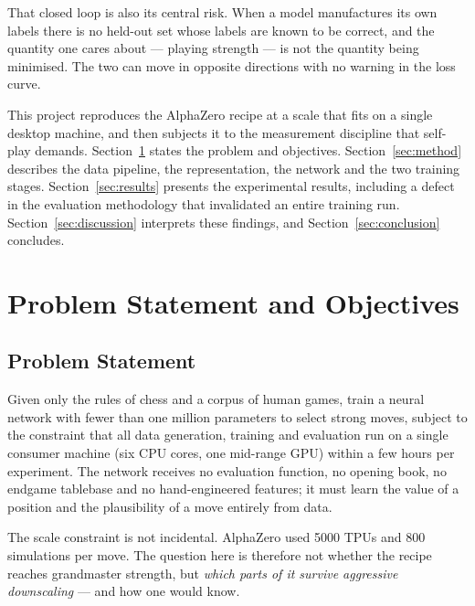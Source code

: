 \documentclass{article}
\begin{document}
That closed loop is also its central risk. When a model manufactures
its own labels there is no held-out set whose labels are known to be correct,
and the quantity one cares about --- playing strength --- is not the quantity
being minimised. The two can move in opposite directions with no warning in
the loss curve.

This project reproduces the AlphaZero recipe at a scale that fits on a single
desktop machine, and then subjects it to the measurement discipline that
self-play demands. Section~\ref{sec:problem} states the problem and
objectives. Section~\ref{sec:method} describes the data pipeline, the
representation, the network and the two training stages.
Section~\ref{sec:results} presents the experimental results, including a
defect in the evaluation methodology that invalidated an entire training run.
Section~\ref{sec:discussion} interprets these findings, and
Section~\ref{sec:conclusion} concludes.

\section{Problem Statement and Objectives}
\label{sec:problem}

\subsection{Problem Statement}
Given only the rules of chess and a corpus of human games, train a neural
network with fewer than one million parameters to select strong moves,
subject to the constraint that all data generation, training and evaluation
run on a single consumer machine (six CPU cores, one mid-range GPU) within a
few hours per experiment. The network receives no evaluation function, no
opening book, no endgame tablebase and no hand-engineered features; it must
learn the value of a position and the plausibility of a move entirely from
data.

The scale constraint is not incidental. AlphaZero used 5000 TPUs and
800 simulations per move. The question here is therefore not whether the
recipe reaches grandmaster strength, but \emph{which parts of it survive
aggressive downscaling} --- and how one would know.
\end{document}
